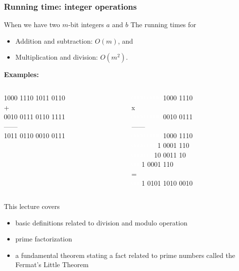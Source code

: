 \begin{frame}\frametitle{Running time: integer operations}
  When we have two $m$-bit integers $a$ and $b$ The running times for
  \begin{itemize}
  \item Addition and subtraction: $O(m)$, and
  \item Multiplication and division: $O(m^2)$.
  \end{itemize}

  \vspace{0.2in}

  {\bf Examples:}

  \vspace{0.1in}
  \begin{columns}
    \begin{column}{0.4\textwidth}
      1000 1110 1011 0110\\
      +\\
      0010 0111 0110 1111\\
      ------ \\
      1011 0110 0010 0111
    \end{column}
    \begin{column}{0.4\textwidth}
      \textcolor{white}{0000 0000} 1000 1110\\
      x\\
      \textcolor{white}{0000 0000} 0010 0111\\
      ------ \\
      \textcolor{white}{0000 0000} 1000 1110\\
      \textcolor{white}{0000 000}1 0001 110\\
      \textcolor{white}{0000 00}10 0011 10\\
      \textcolor{white}{000}1 0001 110\\
      = \\
      \textcolor{white}{000}1 0101 1010 0010
    \end{column}
  \end{columns}
\end{frame}

\begin{frame}
  This lecture covers
  \begin{itemize}
  \item basic definitions related to division and modulo operation
  \item prime factorization
  \item a fundamental theorem stating a fact related to prime numbers
    called the Fermat's Little Theorem
  \end{itemize}
\end{frame}

